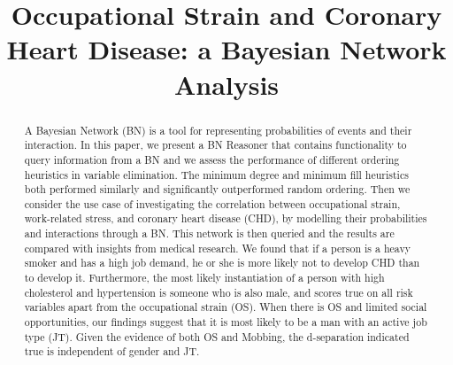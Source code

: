 \documentclass[runningheads]{llncs}
\begin{document}
%
\title{Occupational Strain and Coronary Heart Disease: a Bayesian Network Analysis}
%
%

%
%
\maketitle              %
%
\begin{abstract}
A Bayesian Network (BN) is a tool for representing probabilities of events and their interaction. In this paper, we present a BN Reasoner that contains functionality to query information from a BN and we assess the performance of different ordering heuristics in variable elimination. The minimum degree and minimum fill heuristics both performed similarly and significantly outperformed random ordering. 
Then we consider the use case of investigating the correlation between occupational strain, work-related stress, and coronary heart disease (CHD), by modelling their probabilities and interactions through a BN. This network is then queried and the results are compared with insights from medical research. We found that if a person is a heavy smoker and has a high job demand, he or she is more likely not to develop CHD than to develop it. Furthermore, the most likely instantiation of a person with high cholesterol and hypertension is someone who is also male, and scores true on all risk variables apart from the occupational strain (OS). When there is OS and limited social opportunities, our findings suggest that it is most likely to be a man with an active job type (JT). Given the evidence of both OS and Mobbing, the d-separation indicated true is independent of gender and JT.

\end{abstract}
%
%
%



 

\end{document}
